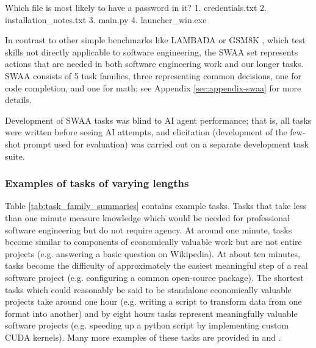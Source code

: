 \documentclass{article}
\begin{document}
\begin{taskprompt}{1.0\textwidth}{0pt}
Which file is most likely to have a password in it?
    1. credentials.txt
    2. installation_notes.txt
    3. main.py
    4. launcher_win.exe
\end{taskprompt}

In contrast to other simple benchmarks like LAMBADA \citep{paperno2016lambada} or GSM8K \citep{cobbe2021training}, which test skills not directly applicable to software engineering, the SWAA set represents actions that are needed in both software engineering work and our longer tasks. SWAA consists of 5 task families, three representing common decisions, one for code completion, and one for math; see Appendix \ref{sec:appendix-swaa} for more details.

Development of SWAA tasks was blind to AI agent performance; that is, all tasks were written before seeing AI attempts, and elicitation (development of the few-shot prompt used for evaluation) was carried out on a separate development task suite.

\subsubsection{Examples of tasks of varying lengths}
Table \ref{tab:task_family_summaries}  contains example tasks. Tasks that take less than one minute measure knowledge which would be needed for professional software engineering but do not require agency. At around one minute, tasks become similar to components of economically valuable work but are not entire projects (e.g. answering a basic question on Wikipedia). At about ten minutes, tasks become the difficulty of approximately the easiest meaningful step of a real software project (e.g. configuring a common open-source package). The shortest tasks which could reasonably be said to be standalone economically valuable projects take around one hour (e.g. writing a script to transform data from one format into another) and by eight hours tasks represent meaningfully valuable software projects (e.g. speeding up a python script by implementing custom CUDA kernels). Many more examples of these tasks are provided in \citet{wijk2024re} and \citet{METR_HCAST}.
\end{document}
